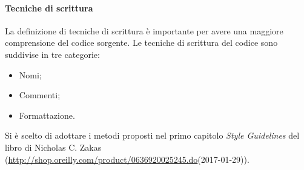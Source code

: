 \documentclass[../NormeDiProgetto_v4.0.0.tex]{subfiles}
\begin{document}
            \paragraph{Tecniche di scrittura}
                  La definizione di tecniche di scrittura è importante per avere una maggiore comprensione del codice sorgente. Le tecniche di scrittura del codice sono suddivise in tre categorie:
                  \begin{itemize}
                        \item Nomi;
                        \item Commenti;
                        \item Formattazione.
                  \end{itemize}
                  Si è scelto di adottare i metodi proposti nel primo capitolo \textit{Style Guidelines} del libro  di Nicholas C. Zakas (\url{http://shop.oreilly.com/product/0636920025245.do}(2017-01-29)).
                  
\end{document}
